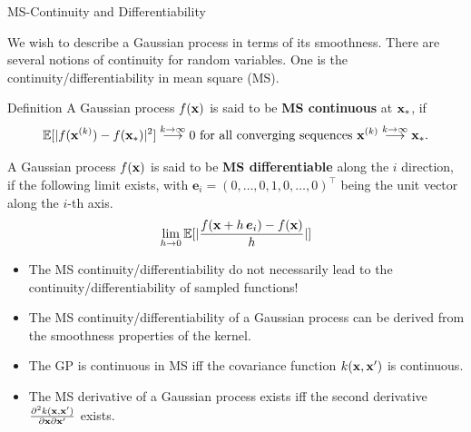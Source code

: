 \begin{frame}[c,allowframebreaks]{MS-Continuity and Differentiability}

We wish to describe a Gaussian process in terms of its smoothness. There are several notions of continuity for random variables. One is the continuity/differentiability in mean square (MS).

\begin{block}{Definition}
A Gaussian process $f(\mathbf{x})$ is said to be \textbf{MS continuous} at $\mathbf{x}_*$, if
\vspace{-3mm}
$$\mathbb{E}[|f(\mathbf{x}^{(k)}) - f(\mathbf{x}_*)|^2] \overset{k \to \infty}{\longrightarrow} 0 \text{ for all converging sequences } \mathbf{x}^{(k)} \overset{k \to \infty}{\longrightarrow} \mathbf{x}_*.$$

\vspace{5mm}
A Gaussian process $f(\mathbf{x})$ is said to be \textbf{MS differentiable} along the $i$ direction, if the following limit exists, with $\bm{e}_i = (0,\dots,0,1,0,\dots,0)^\top$ being the unit vector along the $i$-th axis. $$\lim_{h\to 0}\mathbb{E}[|\frac{f(\mathbf{x} + h\,\bm{e}_i) - f(\mathbf{x})}{h}|]$$ 
\end{block}


 

\framebreak


\begin{itemize}
\item The MS continuity/differentiability do not necessarily lead to the continuity/differentiability of sampled functions!
\vspace{.5cm}

\item The MS continuity/differentiability of a Gaussian process can be derived from the smoothness properties of the kernel.
\vspace{.5cm}

\item The GP is continuous in MS iff the covariance function $k(\mathbf{x}, \mathbf{x}^\prime)$ is continuous.
\vspace{.5cm}

\item The MS derivative of a Gaussian process exists iff the second derivative $\frac{\partial^{2} k(\mathbf{x}, \mathbf{x}^\prime)}{\partial \mathbf{x}\partial \mathbf{x}^\prime}$ exists.

\end{itemize}

\end{frame}
